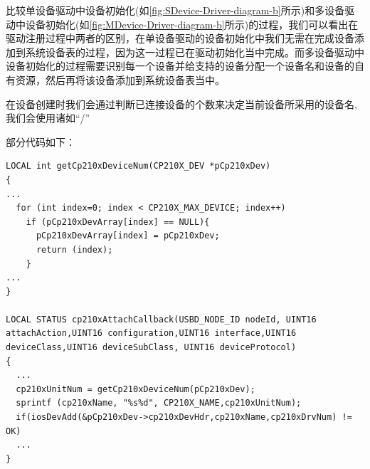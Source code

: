 





















	比较单设备驱动中设备初始化(如\autoref{fig:SDevice-Driver-diagram-b}所示)和多设备驱动中设备初始化(如\autoref{fig:MDevice-Driver-diagram-b}所示)的过程，我们可以看出在驱动注册过程中两者的区别，在单设备驱动的设备初始化中我们无需在完成设备添加到系统设备表的过程，因为这一过程已在驱动初始化当中完成。而多设备驱动中设备初始化的过程需要识别每一个设备并给支持的设备分配一个设备名和设备的自有资源，然后再将该设备添加到系统设备表当中。
	
	在设备创建时我们会通过判断已连接设备的个数来决定当前设备所采用的设备名,我们会使用诸如“/”

部分代码如下：
\lstset{language=C}
\begin{lstlisting}
LOCAL int getCp210xDeviceNum(CP210X_DEV *pCp210xDev)
{
...
  for (int index=0; index < CP210X_MAX_DEVICE; index++)
    if (pCp210xDevArray[index] == NULL){
      pCp210xDevArray[index] = pCp210xDev;
      return (index);
    }
...
}
	
LOCAL STATUS cp210xAttachCallback(USBD_NODE_ID nodeId, UINT16 attachAction,UINT16 configuration,UINT16 interface,UINT16 deviceClass,UINT16 deviceSubClass, UINT16 deviceProtocol)
{
  ...
  cp210xUnitNum = getCp210xDeviceNum(pCp210xDev);
  sprintf (cp210xName, "%s%d", CP210X_NAME,cp210xUnitNum);
  if(iosDevAdd(&pCp210xDev->cp210xDevHdr,cp210xName,cp210xDrvNum) != OK)
  ...
}
\end{lstlisting}
























